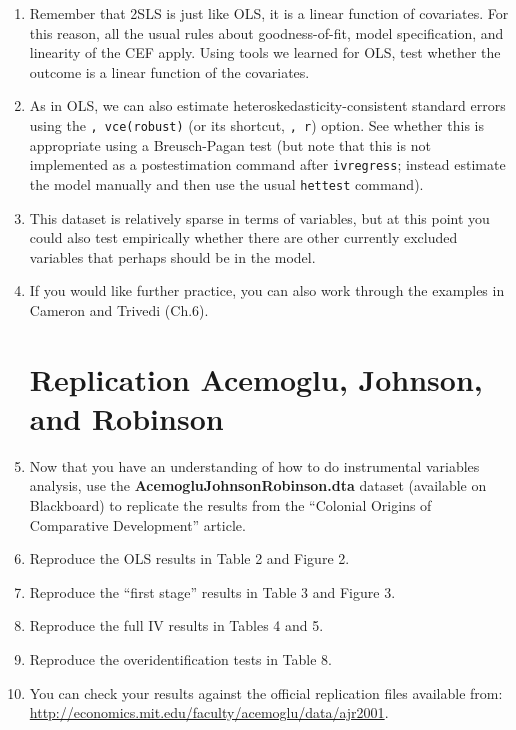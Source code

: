 \documentclass[a4paper,12pt]{article}
\begin{document}
\begin{enumerate}
\item Remember that 2SLS is just like OLS, it is a linear function of covariates. For this reason, all the usual rules about goodness-of-fit, model specification, and linearity of the CEF apply. Using tools we learned for OLS, test whether the outcome is a linear function of the covariates.

\item As in OLS, we can also estimate heteroskedasticity-consistent standard errors using the \texttt{, vce(robust)} (or its shortcut, \texttt{, r}) option. See whether this is appropriate using a Breusch-Pagan test (but note that this is not implemented as a postestimation command after \texttt{ivregress}; instead estimate the model manually and then use the usual \texttt{hettest} command).

\item This dataset is relatively sparse in terms of variables, but at this point you could also test empirically whether there are other currently excluded variables that perhaps should be in the model.

\item If you would like further practice, you can also work through the examples in Cameron and Trivedi (Ch.6).

\section*{Replication Acemoglu, Johnson, and Robinson}


\item Now that you have an understanding of how to do instrumental variables analysis, use the \textbf{AcemogluJohnsonRobinson.dta} dataset (available on Blackboard) to replicate the results from the ``Colonial Origins of Comparative Development'' article.

\item Reproduce the OLS results in Table 2 and Figure 2.

\item Reproduce the ``first stage'' results in Table 3 and Figure 3.

\item Reproduce the full IV results in Tables 4 and 5.

\item Reproduce the overidentification tests in Table 8.

\item You can check your results against the official replication files available from: \url{http://economics.mit.edu/faculty/acemoglu/data/ajr2001}.


\end{enumerate}
\end{document}
